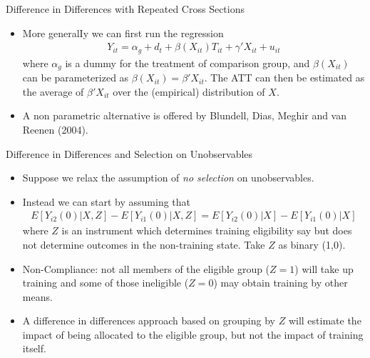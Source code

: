 \documentclass[xcolor=pdftex,dvipsnames,table,mathserif,aspectratio=169]{beamer}
\begin{document}
\begin{frame}{Difference in Differences with Repeated Cross Sections}
\begin{itemize}
\item More generalIy we can first run the regression 
\begin{align*}
Y_{it} = \alpha_g + d_t + \beta (X_{it}) T_{it} + \gamma' X_{it} + u_{it}
\end{align*} 
where $\alpha_g$ is a dummy for the treatment of comparison group, and $\beta (X_{it})$ can be parameterized as $\beta(X_{it}) = \beta' X_{it}$. The ATT can then be estimated as the average of $\beta' X_{it}$ over the (empirical) distribution of $X$.
\item A non parametric alternative is offered by Blundell, Dias, Meghir and van Reenen (2004).
\end{itemize}
\end{frame}

\begin{frame}{Difference in Differences and Selection on Unobservables}
\begin{itemize}
\item Suppose we relax the assumption of \emph{no selection} on unobservables. 
\item Instead we can start by assuming that
\begin{align*}
E[Y_{i2}(0) | X,Z] - E[Y_{i1}(0) | X,Z] = E[Y_{i2}(0) | X] - E[Y_{i1}(0) | X]
\end{align*} 
where $Z$ is an instrument which determines training eligibility say but does not determine outcomes in the non-training state. Take $Z$ as binary (1,0).
\item Non-Compliance: not all members of the eligible group ($Z = 1$) will take up training and some of those ineligible ($Z = 0$) may obtain training by other means.
\item A difference in differences approach based on grouping by $Z$ will estimate the impact of being allocated to the eligible group, but not the impact of training itself.
\end{itemize}
\end{frame}
\end{document}
